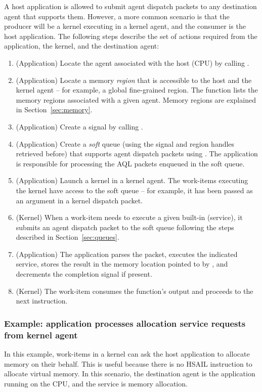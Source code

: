 \documentclass[oneside]{book}
\begin{document}
A host application is allowed to submit agent dispatch packets to any
destination agent that supports them. However, a more common scenario is
that the producer will be a kernel executing in a kernel agent, and the
consumer is the host application. The following steps describe the set of
actions required from the application, the kernel, and the destination agent:
\begin{enumerate}[itemsep=1pt,topsep=3pt,partopsep=0pt]
\item (Application) Locate the agent associated with the host (CPU) by
  calling .
\item (Application) Locate a memory \textit{region} that is accessible to the
  host and the kernel agent -- for example, a global fine-grained region. The
  function  lists the memory regions
  associated with a given agent. Memory regions are explained in
  Section~\ref{sec:memory}.
\item (Application) Create a signal by calling .
\item (Application) Create a \textit{soft} queue (using the signal and region
  handles retrieved before) that supports agent dispatch packets using
  . The application is responsible for processing
  the AQL packets enqueued in the soft queue.
\item (Application) Launch a kernel in a kernel agent. The work-items
  executing the kernel have access to the soft queue -- for example, it has
  been passed as an argument in a kernel dispatch packet.
\item (Kernel) When a work-item needs to execute a given built-in (service), it
  submits an agent dispatch packet to the soft queue following the steps
  described in Section~\ref{sec:queues}.
\item (Application) The application parses the packet, executes the
  indicated service, stores the result in the memory location pointed to by
  , and decrements the
  completion signal if present.
\item (Kernel) The work-item consumes the function's output and proceeds to the
  next instruction.
\end{enumerate}

\subsubsection{Example: application processes allocation service requests from
  kernel agent}
In this example, work-items in a kernel can ask the host application to
allocate memory on their behalf. This is useful because there is no HSAIL
instruction to allocate virtual memory. In this scenario, the destination
agent is the application running on the CPU, and the service is memory
allocation.
\end{document}
